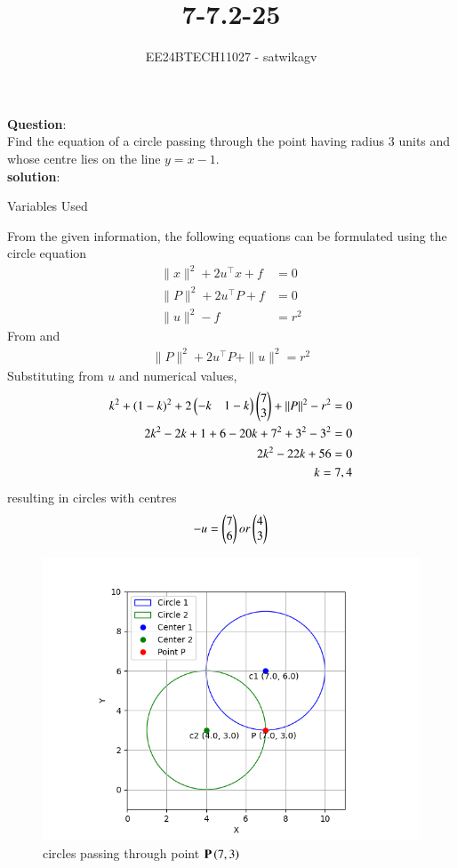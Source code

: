 \documentclass[journal]{IEEEtran}
\begin{document}

\vspace{3cm}

\title{7-7.2-25}
\author{EE24BTECH11027 - satwikagv}
{\let\newpage\relax\maketitle}

\renewcommand{\thefigure}{\theenumi}
\renewcommand{\thetable}{\theenumi}
\setlength{\intextsep}{10pt} %


\renewcommand{\thetable}{\theenumi}
\textbf{Question}:\\
Find the equation of a circle passing through the point  having radius 3 units and whose centre lies on the line $y=x-1$.\\
\textbf{solution}:
\begin{table}[h!]    
  \centering
  
  \caption{Variables Used}
\end{table}
From the given information, the following equations can be formulated using the circle equation 
\begin{align}
\|x\|^2 + 2u^\top x + f &= 0\\
\|P\|^2 + 2u^\top P + f &= 0\\
\|u\|^2 - f &= r^2
\end{align}
From  and 
\begin{align}
\|P\|^2 + 2u^\top P + \|u\|^2 = r^2 	
\end{align}
Substituting from $u$ and numerical values,
\begin{align}
k^2+(1-k)^2+2\begin{pmatrix}-k&1-k\end{pmatrix}\begin{pmatrix}7\\3\end{pmatrix}+\|P\|^2-r^2 = 0\\
2k^2-2k+1+6-20k+7^2+3^2-3^2=0\\
2k^2-22k+56=0\\
k=7,4
\end{align}
resulting in circles with centres 
\begin{align}
-u=\begin{pmatrix}7\\6\end{pmatrix} or \begin{pmatrix}4\\3\end{pmatrix}	
\end{align}
\begin{figure}[h!]
   \centering
   \includegraphics[width=0.7\linewidth]{figs/circle_plot.png}
   \caption{circles passing through point $\mathbf{P}\left(7,3\right)$}
\end{figure}
\end{document}

